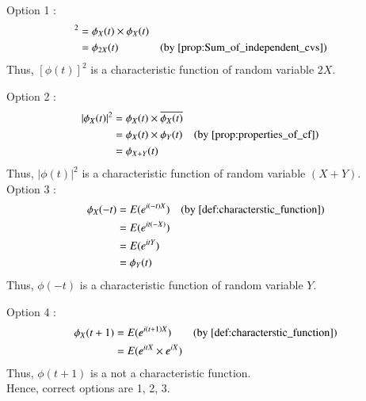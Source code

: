 \documentclass[journal,12pt,twocolumn]{IEEEtran}
\begin{document}
Option 1 :\begin{align*} [\phi_X(t)]^2 &= \phi_X(t)\times\phi_X(t) \\
                &= \phi_{2X}(t) & & \text{(by  \cref{prop:Sum_of_independent_cvs})}
\end{align*}
Thus, $[\phi(t)]^2$ is a characteristic function of random variable $2X$.

Option 2 :\begin{align*} |\phi_X(t)|^2 &= \phi_X(t)\times\overline{\phi_X(t)} \\
                &= \phi_X(t)\times\phi_Y(t) & & \text{(by  \cref{prop:properties_of_cf})}\\
                &= \phi_{X+Y}(t)
\end{align*}
Thus, $|\phi(t)|^2$ is a characteristic function of random variable $(X+Y)$.\\

Option 3 :\begin{align*} \phi_X(-t) &= E(e^{i(-t)X}) & & \text{(by  \cref{def:characterstic_function})} \\
                &= E(e^{it(-X)}) \\
                &= E(e^{itY})\\
                &= \phi_Y(t)
\end{align*}
Thus, $\phi(-t)$ is a characteristic function of random variable $Y$.

Option 4 :\begin{align*} \phi_X(t+1) &= E(e^{i(t+1)X})  & & \text{(by  \cref{def:characterstic_function})} \\
&= E(e^{itX}\times e^{iX}) 
\end{align*}
Thus, $\phi(t+1)$ is a not a characteristic function.\\

Hence, correct options are 1, 2, 3.
\end{document}
